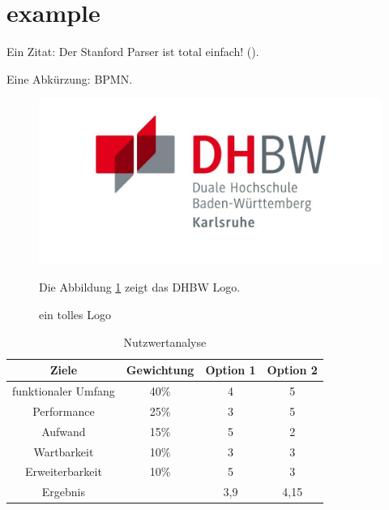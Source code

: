 \section{example}
Ein Zitat: Der Stanford Parser ist total einfach! (\cite[vgl.][274]{STANFORDNLP}).\par 
Eine Abkürzung: \ac{BPMN}.\par

\begin{figure}[H]
\noindent\includegraphics[width=\linewidth,height=\textheight,
keepaspectratio]{pictures/dhbw_logo.png}
\caption{ein tolles Logo}
\label{fig:DHBW}

Die Abbildung \ref{fig:DHBW} zeigt das DHBW Logo.
\end{figure}

\begin{table}[h!]
  \centering
  \begin{tabular}{cccc}
    \toprule
    Ziele & Gewichtung & Option 1 & Option 2\\
    \midrule
	funktionaler Umfang  	& 40\% & 4 & 5 \\    
	Performance 	& 25\% & 3 & 5 \\    
    Aufwand 		& 15\% & 5 & 2 \\
    Wartbarkeit 	& 10\% & 3 & 3 \\
    Erweiterbarkeit & 10\% & 5 & 3 \\
    \midrule
    Ergebnis 		& 	   & 3,9 & 4,15 \\
    \bottomrule
  \end{tabular}
  \caption{Nutzwertanalyse}
  \label{tab:table1}
\end{table}